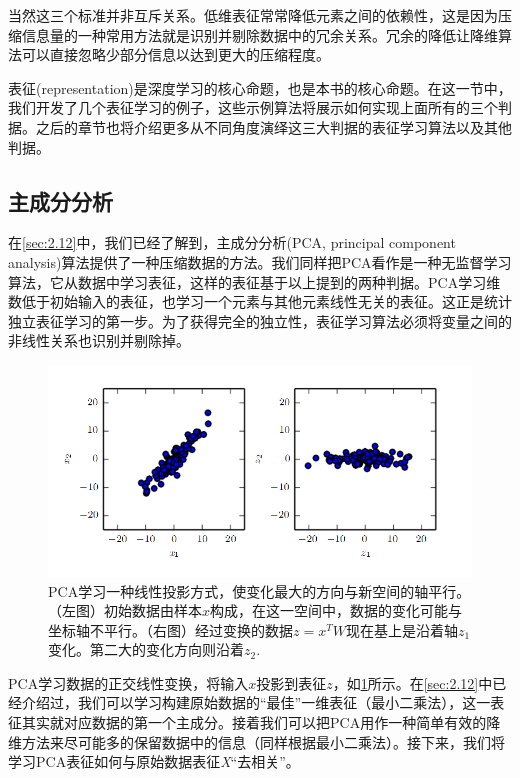当然这三个标准并非互斥关系。低维表征常常降低元素之间的依赖性，这是因为压缩信息量的一种常用方法就是识别并剔除数据中的冗余关系。冗余的降低让降维算法可以直接忽略少部分信息以达到更大的压缩程度。

表征(representation)是深度学习的核心命题，也是本书的核心命题。在这一节中，我们开发了几个表征学习的例子，这些示例算法将展示如何实现上面所有的三个判据。之后的章节也将介绍更多从不同角度演绎这三大判据的表征学习算法以及其他判据。

\subsection{主成分分析}
\label{sec:5.8.1}

在\ref{sec:2.12}中，我们已经了解到，主成分分析(PCA, principal component analysis)算法提供了一种压缩数据的方法。我们同样把PCA看作是一种无监督学习算法，它从数据中学习表征，这样的表征基于以上提到的两种判据。PCA学习维数低于初始输入的表征，也学习一个元素与其他元素线性无关的表征。这正是统计独立表征学习的第一步。为了获得完全的独立性，表征学习算法必须将变量之间的非线性关系也识别并剔除掉。

\begin{figure}[htbp]
   \centering
   \includegraphics[width=6in]{fig/chap5/5_8.png} 
   \caption{PCA学习一种线性投影方式，使变化最大的方向与新空间的轴平行。（左图）初始数据由样本$x$构成，在这一空间中，数据的变化可能与坐标轴不平行。（右图）经过变换的数据$z=x^{T}W$现在基上是沿着轴$z_1$变化。第二大的变化方向则沿着$z_2$.}
   \label{fig:5_8}
\end{figure}

PCA学习数据的正交线性变换，将输入$x$投影到表征$z$，如\ref{fig:5_8}所示。在\ref{sec:2.12}中已经介绍过，我们可以学习构建原始数据的“最佳”一维表征（最小二乘法），这一表征其实就对应数据的第一个主成分。接着我们可以把PCA用作一种简单有效的降维方法来尽可能多的保留数据中的信息（同样根据最小二乘法）。接下来，我们将学习PCA表征如何与原始数据表征\textit{X}“去相关”。

